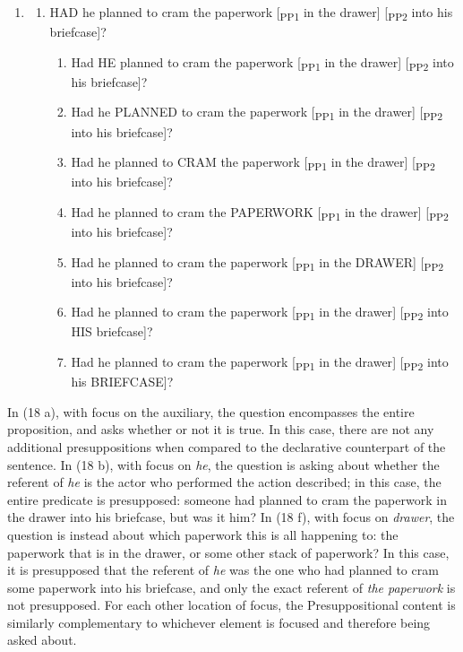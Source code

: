 \documentclass[12pt,oneside]{book}
\providecommand{\tightlist}{%
  \setlength{\itemsep}{0pt}\setlength{\parskip}{0pt}}
\begin{document}
\singlespacing

\begin{enumerate}
\def\labelenumi{(\arabic{enumi})}
\setcounter{enumi}{17}
\item
  \begin{enumerate}
  \def\labelenumii{\alph{enumii}.}
  \tightlist
  \item
    HAD he planned to cram the paperwork {[}\textsubscript{PP1} in the drawer{]} {[}\textsubscript{PP2} into his briefcase{]}?

    \begin{enumerate}
    \def\labelenumiii{\alph{enumiii}.}
    \setcounter{enumiii}{1}
    \tightlist
    \item
      Had HE planned to cram the paperwork {[}\textsubscript{PP1} in the drawer{]} {[}\textsubscript{PP2} into his briefcase{]}?
    \item
      Had he PLANNED to cram the paperwork {[}\textsubscript{PP1} in the drawer{]} {[}\textsubscript{PP2} into his briefcase{]}?
    \item
      Had he planned to CRAM the paperwork {[}\textsubscript{PP1} in the drawer{]} {[}\textsubscript{PP2} into his briefcase{]}?
    \item
      Had he planned to cram the PAPERWORK {[}\textsubscript{PP1} in the drawer{]} {[}\textsubscript{PP2} into his briefcase{]}?
    \item
      Had he planned to cram the paperwork {[}\textsubscript{PP1} in the DRAWER{]} {[}\textsubscript{PP2} into his briefcase{]}?
    \item
      Had he planned to cram the paperwork {[}\textsubscript{PP1} in the drawer{]} {[}\textsubscript{PP2} into HIS briefcase{]}?
    \item
      Had he planned to cram the paperwork {[}\textsubscript{PP1} in the drawer{]} {[}\textsubscript{PP2} into his BRIEFCASE{]}?
    \end{enumerate}
  \end{enumerate}
\end{enumerate}

\doublespacing

In (18 a), with focus on the auxiliary, the question encompasses the entire proposition, and asks whether or not it is true. In this case, there are not any additional presuppositions when compared to the declarative counterpart of the sentence. In (18 b), with focus on \emph{he}, the question is asking about whether the referent of \emph{he} is the actor who performed the action described; in this case, the entire predicate is presupposed: someone had planned to cram the paperwork in the drawer into his briefcase, but was it him? In (18 f), with focus on \emph{drawer}, the question is instead about which paperwork this is all happening to: the paperwork that is in the drawer, or some other stack of paperwork? In this case, it is presupposed that the referent of \emph{he} was the one who had planned to cram some paperwork into his briefcase, and only the exact referent of \emph{the paperwork} is not presupposed. For each other location of focus, the Presuppositional content is similarly complementary to whichever element is focused and therefore being asked about.
\end{document}
